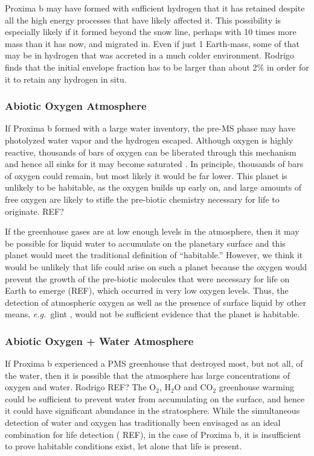 \documentclass[preprint,12pt]{aastex}
\newcommand{\xxx}[1]{{\color{red} #1}} %
\newcommand{\xxx}[1]{{\color{red} #1}} %
\def\eg{{\it e.g.\ }}
\begin{document}
Proxima b may have formed with sufficient hydrogen that it has
retained despite all the high energy processes that have likely
affected it. This possibility is especially likely if it formed beyond
the snow line, perhaps with 10 times more mass than it has now, and
migrated in. Even if just 1 Earth-mass, some of that may be in
hydrogen that was accreted in a much colder environment.
\xxx{Rodrigo finds that the initial envelope fraction has to be larger
than about 2\% in order for it to retain any hydrogen in situ.}

\subsubsection{Abiotic Oxygen Atmosphere}
\label{sec:results:atmstates:o2atmos}

If Proxima b formed with a large water inventory, the pre-MS phase may
have photolyzed water vapor and the hydrogen escaped. Although oxygen
is highly reactive, thousands of bars of oxygen can be liberated
through this mechanism \citep{LugerBarnes15} and hence all sinks for
it may become saturated \citep{Schaefer16}. In principle, thousands of
bars of oxygen could remain, but most likely it would be far
lower. This planet is unlikely to be habitable, as the oxygen builds
up early on, and large amounts of free oxygen are likely to stifle the
pre-biotic chemistry necessary for life to originate. \xxx{REF?}

If the greenhouse gases are at low enough levels in the atmosphere,
then it may be possible for liquid water to accumulate on the
planetary surface and this planet would meet the traditional
definition of ``habitable.'' However, we think it would be unlikely
that life could arise on such a planet because the oxygen would
prevent the growth of the pre-biotic molecules that were necessary for
life on Earth to emerge (REF), which \xxx{occurred} in very low oxygen
levels. Thus, the detection of atmospheric oxygen as well as the
presence of surface liquid by other means, \eg glint
\citep{Robinson10}, would not be sufficient evidence that the planet
is habitable.

\subsubsection{Abiotic Oxygen + Water Atmosphere}
\label{sec:results:atmstates:o2h2oatmos}

If Proxima b experienced a PMS greenhouse that destroyed most, but not
all, of the water, then it is possible that the atmosphere has large
concentrations of oxygen and water. \xxx{Rodrigo REF?} The O$_2$, H$_2$O and CO$_2$
greenhouse warming could be sufficient to prevent water from
accumulating on the surface, and hence it could have significant
abundance in the stratosphere. While the simultaneous detection of
water and oxygen has traditionally been envisaged as an ideal
combination for life detection (\xxx{REF}), in the case of Proxima b, it is
insufficient to prove habitable conditions exist, let alone that life
is present.
\end{document}
